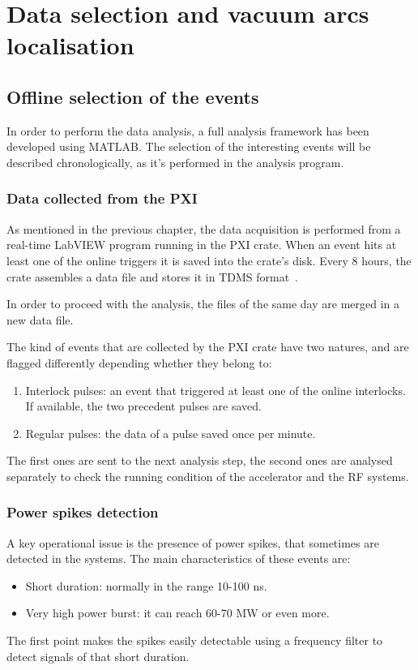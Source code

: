 \chapter[Data selection and vacuum arcs localisation]{Data selection and vacuum arcs localisation}

\section[Offline selection of the events]{Offline selection of the events}

In order to perform the data analysis, a full analysis framework has been developed using MATLAB. The selection of the interesting events will be described chronologically, as it's performed in the analysis program.

\subsection[Data collected from the PXI]{Data collected from the PXI}

As mentioned in the previous chapter, the data acquisition is performed from a real-time LabVIEW program running in the PXI crate. When an event hits at least one of the online triggers it is saved into the crate's disk. Every 8 hours, the crate assembles a data file and stores it in TDMS format~\cite{NI:TDMS}. 

In order to proceed with the analysis, the files of the same day are merged in a new data file.

The kind of events that are collected by the PXI crate have two natures, and are flagged differently depending whether they belong to:
\begin{enumerate}
\item Interlock pulses: an event that triggered at least one of the online interlocks. If available, the two precedent pulses are saved.
\item Regular pulses: the data of a pulse saved once per minute.
\end{enumerate}
The first ones are sent to the next analysis step, the second ones are analysed separately to check the running condition of the accelerator and the RF systems.

\subsection[Power spikes detection]{Power spikes detection}

A key operational issue is the presence of power spikes, that sometimes are detected in the systems. The main characteristics of these events are:
\begin{itemize}
\item Short duration: normally in the range 10-100 ns.
\item Very high power burst: it can reach 60-70 MW or even more.
\end{itemize}
The first point makes the spikes easily detectable using a frequency filter to detect signals of that short duration. 

